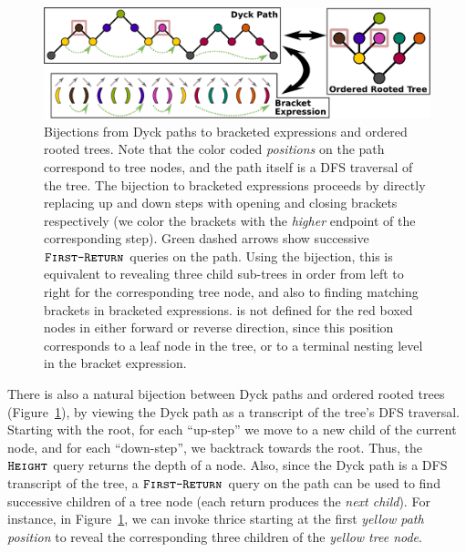 \label{sec:bijections_to_other_catalan_objects}
\begin{figure}[htbp]
    \centering
    \includegraphics[width=\textwidth]{images/dyck_tree_bijection.pdf}
    \caption{Bijections from Dyck paths to bracketed expressions and ordered rooted trees.
    Note that the color coded \emph{positions} on the path correspond to tree nodes, and the path itself is a DFS traversal of the tree.
    The bijection to bracketed expressions proceeds by directly replacing up and down steps with opening and closing brackets respectively
    (we color the brackets with the \emph{higher} endpoint of the corresponding step).
    Green dashed arrows show successive $\texttt{\textsc{First-Return}}$ queries on the path.
    Using the bijection, this is equivalent to revealing three child sub-trees in order from left to right for the corresponding tree node,
    and also to finding matching brackets in bracketed expressions.
     is not defined for the red boxed nodes in either forward or reverse direction,
    since this position corresponds to a leaf node in the tree, or to a terminal nesting level in the bracket expression.}
    \label{fig:dyck_bijection}
\end{figure}
There is also a natural bijection between Dyck paths and ordered rooted trees (Figure~\ref{fig:dyck_bijection}),
by viewing the Dyck path as a transcript of the tree's DFS traversal.
Starting with the root, for each ``up-step'' we move to a new child of the current node, and for each ``down-step'', we backtrack towards the root.
Thus, the $\texttt{\textsc{Height}}$ query returns the depth of a node.
Also, since the Dyck path is a DFS transcript of the tree, a $\texttt{\textsc{First-Return}}$ query on the path
can be used to find successive children of a tree node (each return produces the \emph{next child}).
For instance, in Figure~\ref{fig:dyck_bijection}, we can invoke  thrice
starting at the first \emph{yellow path position} to reveal the corresponding three children of the \emph{yellow tree node}.

